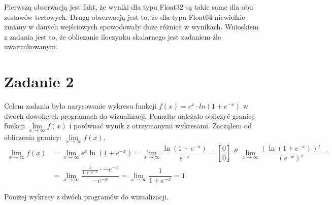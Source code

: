 \documentclass[]{article}
\begin{document}
Pierwszą obserwacją jest fakt, że wyniki dla typu Float32 są takie same dla obu zestawów testowych. Drugą obserwacją jest to, że dla typu Float64 niewielkie zmiany w danych wejściowych spowodowały duże różnice w wynikach. Wnioskiem z zadania jest to, że obliczanie iloczynku skalarnego jest zadaniem źle uwarunkowanym.


	
	
	\section*{Zadanie 2}
	
	Celem zadania było narysowanie wykresu funkcji $f(x) = e^{x}\cdot ln(1+e^{-x})$ w dwóch dowolnych programach do wizualizacji. Ponadto należało obliczyć granicę funkcji \(\lim\limits_{x \to \infty}f(x)\) i porównać wynik z otrzymanymi wykresami. Zacząłem od obliczenia granicy: \(\lim\limits_{x \to \infty}f(x).\)
\begin{equation}
\begin{aligned}
\mathop {\lim }\limits_{x \to \infty} f(x) &= \mathop {\lim }\limits_{x \to \infty} e^x \ln(1 + e^{-x}) = \mathop {\lim }\limits_{x \to \infty} \dfrac{\ln(1 + e^{-x})}{e^{-x}} = \left[\dfrac{0}{0}\right] \stackrel{H}{=} \mathop {\lim }\limits_{x \to \infty} \dfrac{(\ln(1 + e^{-x}))'}{(e^{-x})'} = \\ 
&= \mathop {\lim }\limits_{x \to \infty} \dfrac{\frac{1}{1 + e^{-x}}\cdot -e^{-x}}{-e^{-x}} = \mathop {\lim }\limits_{x \to \infty} \dfrac{1}{1 + e^{-x}} = 1. \nonumber
\end{aligned}
\end{equation}
	
	 Poniżej wykresy z dwóch programów do wizualizacji.
	
\end{document}
